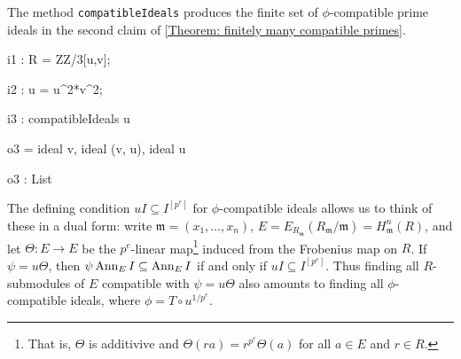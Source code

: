 \documentclass{amsart}
\begin{document}
The method \texttt{compatibleIdeals} produces the finite set of $\phi$-compatible prime ideals in the second claim of \autoref{Theorem: finitely many compatible primes}.

\medskip
{\small
{}
\begin{MyVerbatim}
i1 : R = ZZ/3[u,v];

i2 : u = u^2*v^2;

i3 : compatibleIdeals u

o3 = {ideal v, ideal (v, u), ideal u}

o3 : List
\end{MyVerbatim}
}\medskip

The defining condition $u I \subseteq I^{[p^e]}$ for $\phi$-compatible ideals allows us to
think of these in a dual form: write $\mathfrak{m}=(x_1, \dots, x_n)$,
$E=E_{R_\mathfrak{m}}(R_{\mathfrak{m}}/\mathfrak{m})=H^n_{\mathfrak{m}} (R)$, and let
$\Theta: E \rightarrow E$ be the $p^e$-linear map\footnote{That is, $\Theta$ is additivive and $\Theta (r a)= r^{p^e} \Theta (a)$ for all $a\in E$ and $r\in R$.}
induced from the Frobenius map on $R$.
If $\psi=u \Theta$, then $\psi \operatorname{{Ann}}_E I \subseteq \operatorname{{Ann}}_E I$ if and only if $u I \subseteq  I^{[p^e]}$.
Thus finding all $R$-submodules of $E$ compatible with $\psi=u \Theta$ also amounts to finding all
$\phi$-compatible ideals, where $\phi=T \circ u^{1/p^e}$.
\end{document}
